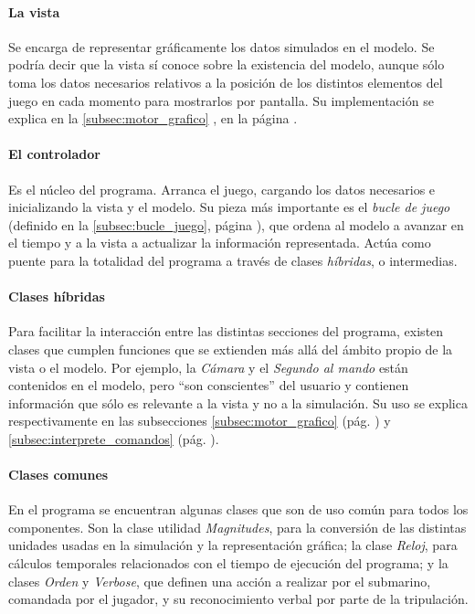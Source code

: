 \documentclass[a4paper,
	11pt,
	parskip=full,
	bibliography=totoc,
	twoside
	]{scrartcl}
\begin{document}
		\paragraph{La vista}
			Se encarga de representar gráficamente los datos simulados en el modelo. Se podría decir que la vista sí conoce sobre la existencia del modelo, aunque sólo toma los datos necesarios relativos a la posición de los distintos elementos del juego en cada momento para mostrarlos por pantalla. Su implementación se explica en la \autoref{subsec:motor_grafico} , en la página \pageref{subsec:motor_grafico}.
			
		\paragraph{El controlador}
			Es el núcleo del programa. Arranca el juego, cargando los datos necesarios e inicializando la vista y el modelo. Su pieza más importante es el \textit{bucle de juego} (definido en la \autoref{subsec:bucle_juego}, página \pageref{subsec:bucle_juego}), que ordena al modelo a avanzar en el tiempo y a la vista a actualizar la información representada. Actúa como puente para la totalidad del programa a través de clases \textit{híbridas}, o intermedias.
			
		\paragraph{Clases híbridas}
			Para facilitar la interacción entre las distintas secciones del programa, existen clases que cumplen funciones que se extienden más allá del ámbito propio de la vista o el modelo. Por ejemplo, la \textit{Cámara} y el \textit{Segundo al mando} están contenidos en el modelo, pero ``son conscientes'' del usuario y contienen información que sólo es relevante a la vista y no a la simulación.  Su uso se explica respectivamente en las subsecciones \ref{subsec:motor_grafico}  (pág. \pageref{subsec:motor_grafico}) y \ref{subsec:interprete_comandos}  (pág. \pageref{subsec:interprete_comandos}).
			
		\paragraph{Clases comunes}
			En el programa se encuentran algunas clases que son de uso común para todos los componentes. Son la clase utilidad \textit{Magnitudes}, para la conversión de las distintas unidades usadas en la simulación y la representación gráfica; la clase \textit{Reloj}, para cálculos temporales relacionados con el tiempo de ejecución del programa; y la clases \textit{Orden} y \textit{Verbose}, que definen una acción a realizar por el submarino, comandada por el jugador, y su reconocimiento verbal por parte de la tripulación.
			
\end{document}
